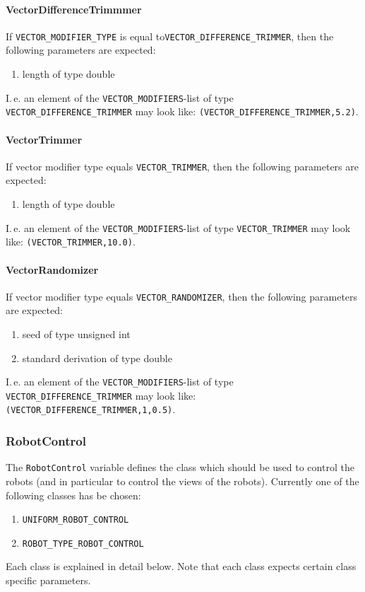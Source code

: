 \paragraph{VectorDifferenceTrimmmer} If \texttt{VECTOR\_MODIFIER\_TYPE} is equal to\newline \texttt{VECTOR\_DIFFERENCE\_TRIMMER}, then the following parameters are expected:
\begin{enumerate}
	\item length of type double
\end{enumerate}
I.\,e. an element of the \texttt{VECTOR\_MODIFIERS}-list of type \texttt{VECTOR\_DIFFERENCE\_TRIMMER} may look like: \texttt{(VECTOR\_DIFFERENCE\_TRIMMER,5.2)}.

\paragraph{VectorTrimmer} If vector modifier type equals \texttt{VECTOR\_TRIMMER}, then the following parameters are expected:
\begin{enumerate}
	\item length of type double
\end{enumerate}
I.\,e. an element of the \texttt{VECTOR\_MODIFIERS}-list of type \texttt{VECTOR\_TRIMMER} may look like: \texttt{(VECTOR\_TRIMMER,10.0)}.

\paragraph{VectorRandomizer} If vector modifier type equals \texttt{VECTOR\_RANDOMIZER}, then the following parameters are expected:
\begin{enumerate}
	\item seed of type unsigned int
	\item standard derivation of type double
\end{enumerate}
I.\,e. an element of the \texttt{VECTOR\_MODIFIERS}-list of type \texttt{VECTOR\_DIFFERENCE\_TRIMMER} may look like: \texttt{(VECTOR\_DIFFERENCE\_TRIMMER,1,0.5)}.

\subsubsection{RobotControl}\label{sec:robotControl}
The \texttt{RobotControl} variable defines the class which should be used to control the robots (and in particular to control the views of the robots). Currently one of the following classes has be chosen:
\begin{enumerate}
	\item \texttt{UNIFORM\_ROBOT\_CONTROL}
	\item \texttt{ROBOT\_TYPE\_ROBOT\_CONTROL}
\end{enumerate}
Each class is explained in detail below. Note that each class expects certain class specific parameters.

